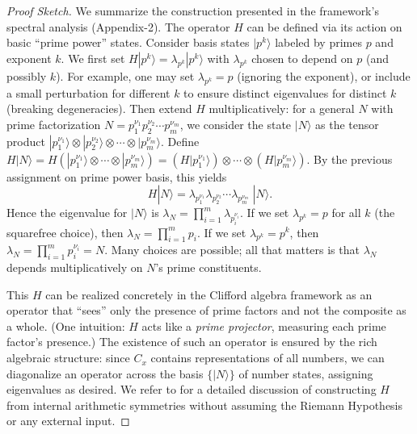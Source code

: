 \documentclass[11pt]{article}
\begin{document}
\begin{proof}[Proof Sketch]
We summarize the construction presented in the framework’s spectral analysis (Appendix-2). The operator $H$ can be defined via its action on basic “prime power” states. Consider basis states $|p^k\rangle$ labeled by primes $p$ and exponent $k$. We first set $H|p^k\rangle = \lambda_{p^k} |p^k\rangle$ with $\lambda_{p^k}$ chosen to depend on $p$ (and possibly $k$). For example, one may set $\lambda_{p^k} = p$ (ignoring the exponent), or include a small perturbation for different $k$ to ensure distinct eigenvalues for distinct $k$ (breaking degeneracies). Then extend $H$ multiplicatively: for a general $N$ with prime factorization $N = p_1^{\nu_1} p_2^{\nu_2}\cdots p_m^{\nu_m}$, we consider the state $|N\rangle$ as the tensor product $|p_1^{\nu_1}\rangle \otimes |p_2^{\nu_2}\rangle \otimes \cdots \otimes |p_m^{\nu_m}\rangle$. Define $H|N\rangle = H(|p_1^{\nu_1}\rangle \otimes \cdots \otimes |p_m^{\nu_m}\rangle) = (H|p_1^{\nu_1}\rangle)\otimes \cdots \otimes (H|p_m^{\nu_m}\rangle)$. By the previous assignment on prime power basis, this yields 
\[ H|N\rangle = \lambda_{p_1^{\nu_1}}\lambda_{p_2^{\nu_2}}\cdots \lambda_{p_m^{\nu_m}} \; |N\rangle. \] 
Hence the eigenvalue for $|N\rangle$ is $\lambda_N = \prod_{i=1}^m \lambda_{p_i^{\nu_i}}$. If we set $\lambda_{p^k} = p$ for all $k$ (the squarefree choice), then $\lambda_N = \prod_{i=1}^m p_i$. If we set $\lambda_{p^k} = p^k$, then $\lambda_N = \prod_{i=1}^m p_i^{\nu_i} = N$. Many choices are possible; all that matters is that $\lambda_N$ depends multiplicatively on $N$’s prime constituents.

This $H$ can be realized concretely in the Clifford algebra framework as an operator that “sees” only the presence of prime factors and not the composite as a whole. (One intuition: $H$ acts like a \emph{prime projector}, measuring each prime factor’s presence.) The existence of such an operator is ensured by the rich algebraic structure: since $C_x$ contains representations of all numbers, we can diagonalize an operator across the basis $\{|N\rangle\}$ of number states, assigning eigenvalues as desired. We refer to  for a detailed discussion of constructing $H$ from internal arithmetic symmetries without assuming the Riemann Hypothesis or any external input.
\end{proof}
\end{document}
